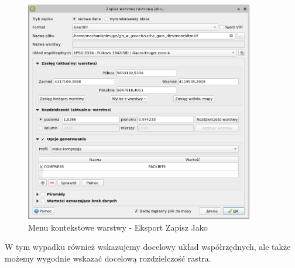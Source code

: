 \documentclass[a4paper,11pt, onecolumn, openany]{memoir}
\begin{document}
	\begin{figure}[!ht]
	\centering
	\includegraphics[width=10cm]{crs-cwiczenie2-zapisz-raster}
	\caption{Menu kontekstowe warstwy - Eksport Zapisz Jako}
\end{figure} 		
W tym wypadku również wskazujemy docelowy układ współrzędnych, ale także możemy wygodnie wskazać docelową rozdzielczość rastra.
\end{document}
